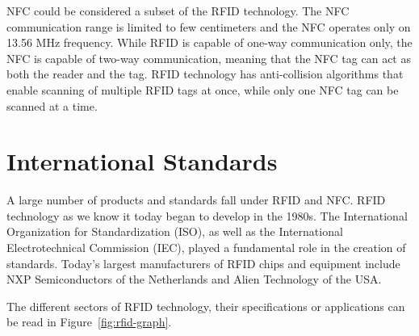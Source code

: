 NFC could be considered a subset of the RFID technology. The NFC communication range is limited to few centimeters and the NFC operates only on 13.56 MHz frequency. While RFID is capable of one-way communication only, the NFC is capable of two-way communication, meaning that the NFC tag can act as both the reader and the tag. RFID technology has anti-collision algorithms that enable scanning of multiple RFID tags at once, while only one NFC tag  can be scanned at a time.~\cite{rfidnfcdifference}




\section{International Standards}

A large number of products and standards fall under RFID and NFC. RFID technology as we know it today began to develop in the 1980s. The International Organization for Standardization (ISO), as well as the International Electrotechnical Commission (IEC), played a fundamental role in the creation of standards. Today's largest manufacturers of RFID chips and equipment include NXP Semiconductors of the Netherlands and Alien Technology of the USA.~\cite{masyuk2019information}

The different sectors of RFID technology, their specifications or applications can be read in Figure~\ref{fig:rfid-graph}.


